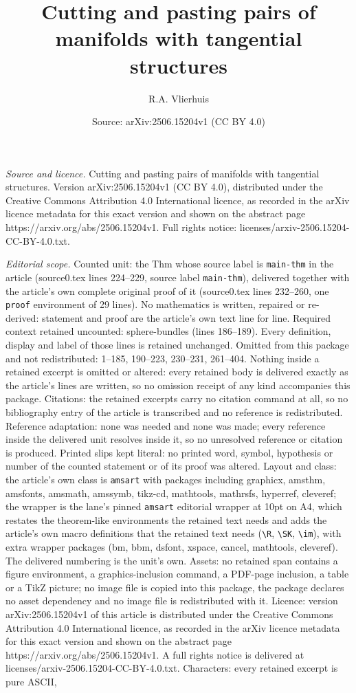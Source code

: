 \documentclass[10pt,a4paper]{amsart}
\title[Cutting and pasting pairs of manifolds with tangential struc]{Cutting and pasting pairs of manifolds with tangential structures}
\author{R.A. Vlierhuis}
\date{Source: arXiv:2506.15204v1 (CC BY 4.0)}
\begin{document}
\maketitle

\noindent\emph{Source and licence.} Cutting and pasting pairs of manifolds with tangential structures. Version arXiv:2506.15204v1 (CC BY 4.0), distributed under the Creative Commons Attribution 4.0 International licence, as recorded in the arXiv licence metadata for this exact version and shown on the abstract page https://arxiv.org/abs/2506.15204v1. Full rights notice: licenses/arxiv-2506.15204-CC-BY-4.0.txt.\par\smallskip

\noindent\textit{Editorial scope.} Counted unit: the Thm whose source label is \texttt{main-thm} in the article (source0.tex lines 224--229, source label \texttt{main-thm}), delivered together with the article's own complete original proof of it (source0.tex lines 232--260, one \texttt{proof} environment of 29 lines). No mathematics is written, repaired or re-derived: statement and proof are the article's own text line for line. Required context retained uncounted: sphere-bundles (lines 186--189). Every definition, display and label of those lines is retained unchanged. Omitted from this package and not redistributed: 1--185, 190--223, 230--231, 261--404. Nothing inside a retained excerpt is omitted or altered: every retained body is delivered exactly as the article's lines are written, so no omission receipt of any kind accompanies this package. Citations: the retained excerpts carry no citation command at all, so no bibliography entry of the article is transcribed and no reference is redistributed. Reference adaptation: none was needed and none was made; every reference inside the delivered unit resolves inside it, so no unresolved reference or citation is produced. Printed slips kept literal: no printed word, symbol, hypothesis or number of the counted statement or of its proof was altered. Layout and class: the article's own class is \texttt{amsart} with packages including graphicx, amsthm, amsfonts, amsmath, amssymb, tikz-cd, mathtools, mathrsfs, hyperref, cleveref; the wrapper is the lane's pinned \texttt{amsart} editorial wrapper at 10pt on A4, which restates the theorem-like environments the retained text needs and adds the article's own macro definitions that the retained text needs (\texttt{\textbackslash R}, \texttt{\textbackslash SK}, \texttt{\textbackslash im}), with extra wrapper packages (bm, bbm, dsfont, xspace, cancel, mathtools, cleveref). The delivered numbering is the unit's own. Assets: no retained span contains a figure environment, a graphics-inclusion command, a PDF-page inclusion, a table or a TikZ picture; no image file is copied into this package, the package declares no asset dependency and no image file is redistributed with it. Licence: version arXiv:2506.15204v1 of this article is distributed under the Creative Commons Attribution 4.0 International licence, as recorded in the arXiv licence metadata for this exact version and shown on the abstract page https://arxiv.org/abs/2506.15204v1. A full rights notice is delivered at licenses/arxiv-2506.15204-CC-BY-4.0.txt. Characters: every retained excerpt is pure ASCII, 
\end{document}
